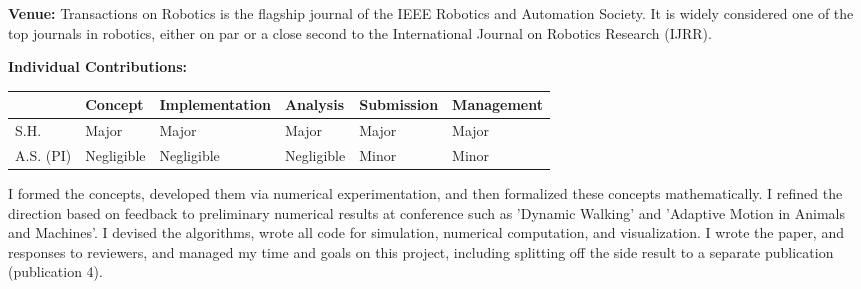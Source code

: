 \textbf{Venue: }
Transactions on Robotics is the flagship journal of the IEEE Robotics and Automation Society. It is widely considered one of the top journals in robotics, either on par or a close second to the International Journal on Robotics Research (IJRR). \par
\textbf{Individual Contributions: }
\begin{table}[h!]
\begin{tabular}{l|l|l|l|l|l|}
\cline{2-6}
 \textbf{} & \textbf{Concept} & {\footnotesize \textbf{Implementation}} & \textbf{Analysis} & \textbf{Submission} & {\footnotesize \textbf{Management}} \\ \hline
\multicolumn{1}{|l|}{S.H.} & Major & Major & Major & Major & Major \\ \hline
\multicolumn{1}{|l|}{A.S. (PI)} & Negligible & Negligible & Negligible & Minor & Minor \\ \hline
\end{tabular}
\end{table}
I formed the concepts, developed them via numerical experimentation, and then formalized these concepts mathematically. I refined the direction based on feedback to preliminary numerical results at conference such as 'Dynamic Walking' and 'Adaptive Motion in Animals and Machines'. I devised the algorithms, wrote all code for simulation, numerical computation, and visualization. I wrote the paper, and responses to reviewers, and managed my time and goals on this project, including splitting off the side result to a separate publication (publication 4). \\


